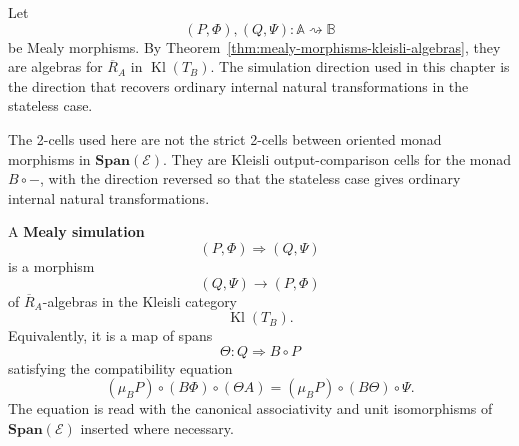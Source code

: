 Let
\[
    (P,\Phi),(Q,\Psi):\mathbb A\rightsquigarrow\mathbb B
\]
be Mealy morphisms. By Theorem~\ref{thm:mealy-morphisms-kleisli-algebras}, they are algebras for \(\overline R_A\) in \(\operatorname{Kl}(T_B)\). The simulation direction used in this chapter is the direction that recovers ordinary internal natural transformations in the stateless case.

The 2-cells used here are not the strict 2-cells between oriented monad morphisms in \(\mathbf{Span}(\mathcal E)\). They are Kleisli output-comparison cells for the monad \(B\circ-\), with the direction reversed so that the stateless case gives ordinary internal natural transformations.

\begin{definition}
\label{def:mealy-simulation}
    A \textbf{Mealy simulation}
    \[
        (P,\Phi)\Rightarrow(Q,\Psi)
    \]
    is a morphism
    \[
        (Q,\Psi)\to(P,\Phi)
    \]
    of \(\overline R_A\)-algebras in the Kleisli category
    \[
        \operatorname{Kl}(T_B).
    \]
    Equivalently, it is a map of spans
    \[
        \Theta:Q\Rightarrow B\circ P
    \]
    satisfying the compatibility equation
    \begin{equation}
        (\mu_B P)\circ(B\Phi)\circ(\Theta A)
        =
        (\mu_B P)\circ(B\Theta)\circ\Psi.
        \label{eq:mealy-simulation-abstract}
    \end{equation}
    The equation is read with the canonical associativity and unit isomorphisms of \(\mathbf{Span}(\mathcal E)\) inserted where necessary.
\end{definition}

